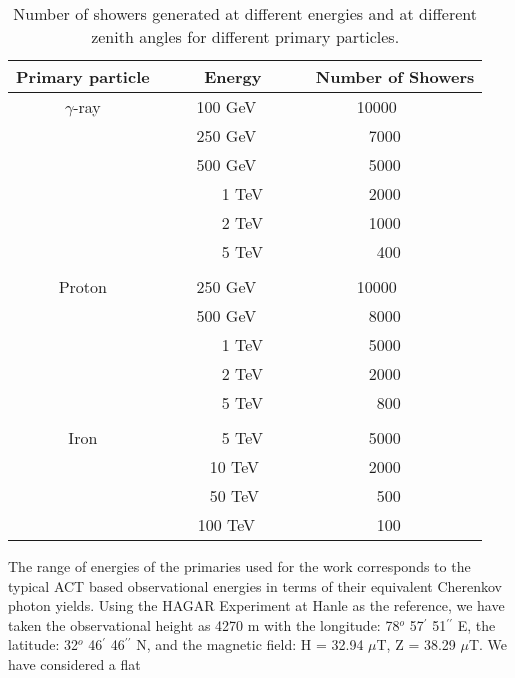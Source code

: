 \documentclass[amsmath,amssymb,showpacs,showkeywords]{revtex4}
\begin{document}
\vspace{-0.4cm}
\begin{center}
\begin{table}[ht]
\caption{\label{tab1} Number of showers generated at different energies and at 
different zenith angles for different primary particles.}
\begin{tabular}{ccc}\hline
Primary particle & ~~~~Energy & ~~~~Number of Showers \\\hline
$\gamma$-ray  &  ~~~100 GeV  & 10000 \\
              &  ~~~250 GeV  &  ~~7000 \\
              &  ~~~500 GeV  &  ~~5000 \\
              &  ~~~~~~~1 TeV    &  ~~2000 \\
              &  ~~~~~~~2 TeV    &  ~~1000 \\
              &  ~~~~~~~5 TeV    &  ~~~400 \\
  && \\
 Proton       &  ~~~250 GeV  & 10000 \\
              &  ~~~500 GeV  &  ~~8000 \\
              &  ~~~~~~~1 TeV    &  ~~5000 \\
              &  ~~~~~~~2 TeV    &  ~~2000 \\
              &  ~~~~~~~5 TeV    &  ~~~800 \\
 && \\
 Iron         &  ~~~~~~~5 TeV  & ~~5000 \\
              &  ~~~~~10 TeV  &  ~~2000 \\
              &  ~~~~~50 TeV    &  ~~~500 \\
              &  ~~~100 TeV    & ~~~100 \\
            
\hline
\end{tabular}
\end{table}
\end{center}
\vspace{-0.5cm}
The range of energies of the primaries used for the work corresponds to the 
typical ACT based observational energies in terms of their equivalent Cherenkov
photon yields. Using the HAGAR Experiment \cite{Chitnis} at Hanle as the 
reference, we have 
taken the observational height as 4270 m with the longitude: 78$^o$ 57$^\prime$
51$^{\prime\prime}$ E, the latitude: 32$^o$ 46$^\prime$ 46$^{\prime\prime}$ N,
and the magnetic field: H = 32.94 $\mu$T, Z = 38.29 $\mu$T. We have considered 
a flat 
\end{document}
